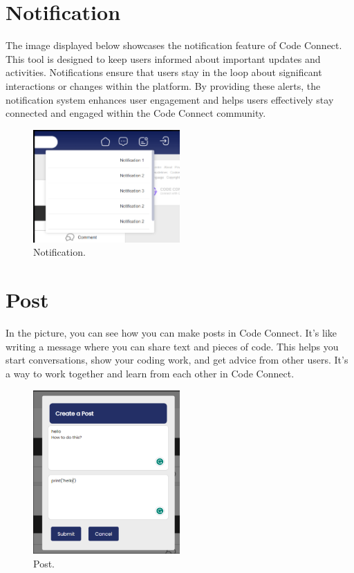 \section{Notification}
The image displayed below showcases the notification feature of Code Connect. This tool is designed to keep users informed about important updates and activities. Notifications ensure that users stay in the loop about significant interactions or changes within the platform. By providing these alerts, the notification system enhances user engagement and helps users effectively stay connected and engaged within the Code Connect community.
\begin{figure}[ht]
    \centering
    \includegraphics[width=0.5\textwidth]{Outcome-ss/notification.png}
    \caption{Notification.}
    \label{fig:Notification}
\end{figure}

\section{Post}
In the picture, you can see how you can make posts in Code Connect. It's like writing a message where you can share text and pieces of code. This helps you start conversations, show your coding work, and get advice from other users. It's a way to work together and learn from each other in Code Connect.
\begin{figure}[ht]
    \centering
    \includegraphics[width=0.5\textwidth]{Outcome-ss/post.png}
    \caption{Post.}
    \label{fig:Post}
\end{figure}
